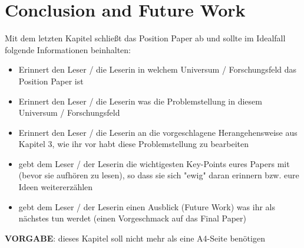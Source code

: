 


\section{Conclusion and Future Work}

Mit dem letzten Kapitel schließt das Position Paper ab und sollte im Idealfall folgende Informationen beinhalten:
\begin{itemize}
	\item Erinnert den Leser / die Leserin in welchem Universum / Forschungsfeld das Position Paper ist
	\item Erinnert den Leser / die Leserin was die Problemstellung in diesem Universum / Forschungsfeld
	\item Erinnert den Leser / die Leserin an die vorgeschlagene Herangehensweise aus Kapitel 3, wie ihr vor habt diese Problemstellung zu bearbeiten
	\item gebt dem Leser / der Leserin die wichtigesten Key-Points eures Papers mit (bevor sie aufhören zu lesen), so dass sie sich "ewig" daran erinnern bzw. eure Ideen weitererzählen
	\item gebt dem Leser / der Leserin einen Ausblick (Future Work) was ihr als nächstes tun werdet (einen Vorgeschmack auf das Final Paper)
\end{itemize}

\vspace{10pt}
\textbf{VORGABE}: dieses Kapitel soll nicht mehr als eine A4-Seite benötigen

